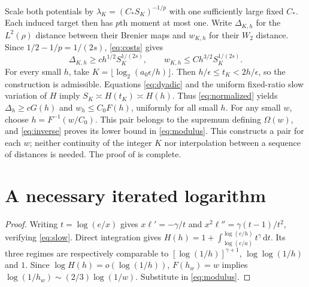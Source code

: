 \documentclass[11pt]{article}
\newtheorem{corollary}[theorem]{Corollary}
\theoremstyle{remark}\newtheorem{remark}[theorem]{Remark}
\newcommand{\dd}{\,\mathrm d}
\begin{document}
Scale both potentials by $\lambda_K=(C_*S_K)^{-1/p}$ with one sufficiently large fixed $C_*$. Each induced target then has $p$th moment at most one. Write $\Delta_{K,h}$ for the $L^2(\rho)$ distance between their Brenier maps and $w_{K,h}$ for their $W_2$ distance. Since $1/2-1/p=1/(2s)$, \eqref{eq:costs} gives
\begin{equation}\label{eq:normalized}
 \Delta_{K,h}\ge c h^{1/2}S_K^{1/(2s)},\qquad
 w_{K,h}\le C h^{3/2}S_K^{1/(2s)}.
\end{equation}
For every small $h$, take
$K=\lfloor\log_2(a_0\epsilon/h)\rfloor$.
Then $h/\epsilon\le t_K<2h/\epsilon$, so the construction is admissible. Equations \eqref{eq:dyadic} and the uniform fixed-ratio slow variation of $H$ imply
$S_K\asymp H(t_K)\asymp H(h)$.
Thus \eqref{eq:normalized} yields $\Delta_h\ge cG(h)$ and $w_h\le C_0F(h)$, uniformly for all small $h$. For any small $w$, choose $h=F^{-1}(w/C_0)$. This pair belongs to the supremum defining $\Omega(w)$, and \eqref{eq:inverse} proves its lower bound in \eqref{eq:modulus}. This constructs a pair for each $w$; neither continuity of the integer $K$ nor interpolation between a sequence of distances is needed. The proof of  is complete.

\section{A necessary iterated logarithm}
\begin{proof}
Writing $t=\log(e/x)$ gives $x\ell'=-\gamma/t$ and
$x^2\ell''=\gamma(t-1)/t^2$, verifying \eqref{eq:slow}. Direct integration gives
$H(h)=1+\int_{\log(e/a)}^{\log(e/h)}t^\gamma\dd t$.
Its three regimes are respectively comparable to
$[\log(1/h)]^{\gamma+1}$, $\log\log(1/h)$ and $1$.
Since $\log H(h)=o(\log(1/h))$, $F(h_w)=w$ implies
$\log(1/h_w)\sim(2/3)\log(1/w)$. Substitute in \eqref{eq:modulus}.
\end{proof}
\end{document}
